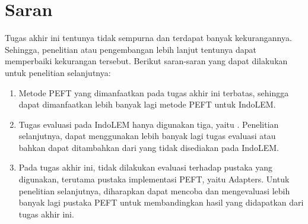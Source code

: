 \section{Saran}

Tugas akhir ini tentunya tidak sempurna dan terdapat banyak kekurangannya. Sehingga, penelitian atau pengembangan lebih lanjut tentunya dapat memperbaiki kekurangan tersebut. Berikut saran-saran yang dapat dilakukan untuk penelitian selanjutnya:
\begin{enumerate}
    \item{
        Metode PEFT yang dimanfaatkan pada tugas akhir ini terbatas, sehingga dapat dimanfaatkan lebih banyak lagi metode PEFT untuk IndoLEM.
    }
    \item {
        Tugas evaluasi pada IndoLEM hanya digunakan tiga, yaitu \nlptask. Penelitian selanjutnya, dapat menggunakan lebih banyak lagi tugas evaluasi atau bahkan dapat ditambahkan dari yang tidak disediakan pada IndoLEM.
    }
    \item {
        Pada tugas akhir ini, tidak dilakukan evaluasi terhadap pustaka yang digunakan, terutama pustaka implementasi PEFT, yaitu Adapters. Untuk penelitian selanjutnya, diharapkan dapat mencoba dan mengevaluasi lebih banyak lagi pustaka PEFT untuk membandingkan hasil yang didapatkan dari tugas akhir ini.
    }
\end{enumerate}

